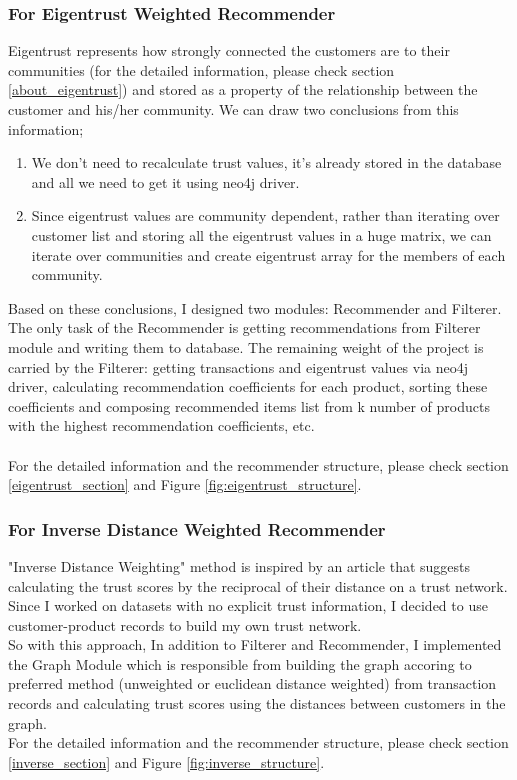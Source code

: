 \subsubsection{For Eigentrust Weighted Recommender}
Eigentrust represents how strongly connected the customers are to their communities (for the detailed information, please check section \ref{about_eigentrust}) and stored as a property of the relationship between the customer and his/her community. We can draw two conclusions from this information;
\begin{enumerate}
	\item We don't need to recalculate trust values, it's already stored in the database and all we need to get it using neo4j driver.
	\item Since eigentrust values are community dependent, rather than iterating over customer list and storing all the eigentrust values in a huge matrix, we can iterate over communities and create eigentrust array for the members of each community.
\end{enumerate}
Based on these conclusions, I designed two modules: Recommender and Filterer. The only task of the Recommender is getting recommendations from Filterer module and writing them to database.  The remaining weight of the project is carried by the Filterer: getting transactions and eigentrust values via neo4j driver, calculating recommendation coefficients for each product, sorting these coefficients and composing recommended items list from k number of products with the highest recommendation coefficients, etc. \\ \\
For the detailed information and the recommender structure, please check section \ref{eigentrust_section} and Figure \ref{fig:eigentrust_structure}.
\subsubsection{For Inverse Distance Weighted Recommender}
"Inverse Distance Weighting" method is inspired by an article\cite{inverse_article} that suggests calculating the trust scores by the reciprocal of their distance on a trust network. Since I worked on datasets with no explicit trust information, I decided to use customer-product records to build my own trust network. \\

So with this approach, In addition to Filterer and Recommender, I implemented the Graph Module which is responsible from building the graph accoring to preferred method (unweighted or euclidean distance weighted) from transaction records and calculating trust scores using the distances between customers in the graph. \\

For the detailed information and the recommender structure, please check section \ref{inverse_section} and Figure \ref{fig:inverse_structure}.